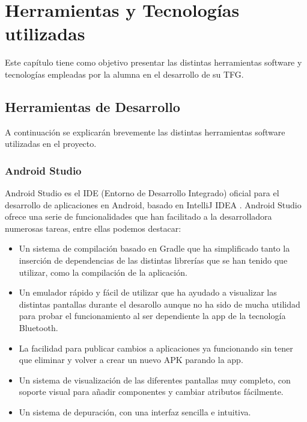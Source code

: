 %
%
%

\cleardoublepage
\chapter{Herramientas y Tecnologías utilizadas} \label{chap:Tecnologias} 

Este capítulo tiene como objetivo presentar las distintas herramientas software y tecnologías empleadas por la alumna en el desarrollo de su TFG.

\section{Herramientas de Desarrollo}

A continuación se explicarán brevemente las distintas herramientas software utilizadas en el proyecto. 

\subsection{Android Studio}

Android Studio \cite{URL::AndroidStudio} es el IDE (Entorno de Desarrollo Integrado) oficial para el desarrollo de aplicaciones en Android, basado en IntelliJ IDEA \cite{URL::IntelliJIDEA}. Android Studio ofrece una serie de funcionalidades que han facilitado a la desarrolladora numerosas tareas, entre ellas podemos destacar:


\begin{itemize}
\item Un sistema de compilación basado en Gradle\cite{URL::Gradle} que ha simplificado tanto la inserción de dependencias de las distintas librerías que se han tenido que utilizar, como la compilación de la aplicación.
\item Un emulador rápido y fácil de utilizar que ha ayudado a visualizar las distintas pantallas durante el desarollo aunque no ha sido de mucha utilidad para probar el funcionamiento al ser dependiente la app de la tecnología Bluetooth.
\item La facilidad para publicar cambios a aplicaciones ya funcionando sin tener que eliminar y volver a crear un nuevo APK parando la app.
\item Un sistema de visualización de las diferentes pantallas muy completo, con soporte visual para añadir componentes y cambiar atributos fácilmente.
\item Un sistema de depuración, con una interfaz sencilla e intuitiva.
\end{itemize} 

